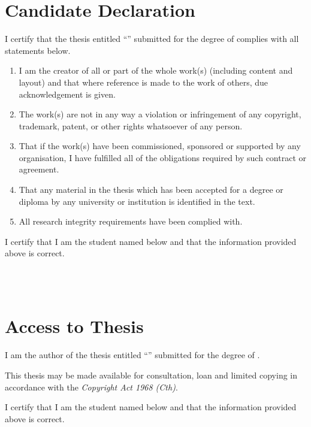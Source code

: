 \newpage
\chapter*{Candidate Declaration}

I certify that the thesis entitled ``\textit{\thetitle{}}'' submitted for the degree of \thedegree{} complies with all statements below.\bigskip
\begin{enumerate}[label=(\roman*)]
  \item I am the creator of all or part of the whole work(s) (including content and layout) and that where reference is made to the work of others, due acknowledgement is given.    
  \item The work(s) are not in any way a violation or infringement of any copyright, trademark, patent, or other rights whatsoever of any person.
  \item That if the work(s) have been commissioned, sponsored or supported by any organisation, I have fulfilled all of the obligations required by such contract or agreement.
  \item That any material in the thesis which has been accepted for a degree or diploma by any university or institution is identified in the text.
  \item All research integrity requirements have been complied with.
\end{enumerate}\bigskip
I certify that I am the student named below and that the information provided above is correct.

\vspace{2cm}

\noindent
\hspace{\fill}
\parbox[b]{0.4\linewidth}{
  \hrulefill\\
  \raggedleft
  \theauthor{}\\
  \footnotesize
  \thedate{}
}

\newpage
\chapter*{Access to Thesis}

I am the author of the thesis entitled ``\textit{\thetitle{}}'' submitted for the degree of \thedegree{}.

\bigskip
\noindent
This thesis may be made available for consultation, loan and limited copying in accordance with the \textit{Copyright Act 1968 (Cth)}.

\bigskip
\noindent
I certify that I am the student named below and that the information provided above is correct.

\vspace{2cm}

\noindent
\hspace{\fill}
\parbox[b]{0.4\linewidth}{
  \hrulefill\\
  \raggedleft
  \theauthor{}\\
  \footnotesize
  \thedate{}
}